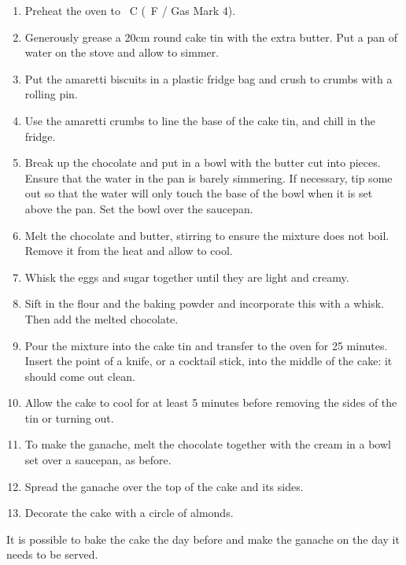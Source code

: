 \documentclass[main.tex]{subfiles}
\begin{document}
\begin{enumerate}
    \item Preheat the oven to \unit[180]{\textdegree C} (\unit[250]{\textdegree F} / Gas Mark 4).
    \item Generously grease a 20cm round cake tin with the extra butter. Put a pan of water on the stove and allow to simmer.
    \item Put the amaretti biscuits in a plastic fridge bag and crush to crumbs with a rolling pin.
    \item Use the amaretti crumbs to line the base of the cake tin, and chill in the fridge.
    \item Break up the chocolate and put in a bowl with the butter cut into pieces. Ensure that the water in the pan is barely simmering. If necessary, tip some out so that the water will only touch the base of the bowl when it is set above the pan. Set the bowl over the saucepan.
    \item Melt the chocolate and butter, stirring to ensure the mixture does not boil. Remove it from the heat and allow to cool. 
    \item Whisk the eggs and sugar together until they are light and creamy.
    \item Sift in the flour and the baking powder and incorporate this with a whisk. Then add the melted chocolate.
    \item  Pour the mixture into the cake tin and transfer to the oven for 25 minutes. Insert the point of a knife, or a cocktail stick, into the middle of the cake: it should come out clean. 
    \item Allow the cake to cool for at least 5 minutes before removing the sides of the tin or turning out. 
    \item To make the ganache, melt the chocolate together with the cream in a bowl set over a saucepan, as before. 
    \item Spread the ganache over the top of the cake and its sides.
    \item Decorate the cake with a circle of almonds.
	
\end{enumerate}
    
 It is possible to bake the cake the day before and make the ganache on the day it needs to be served. 

\end{document}
